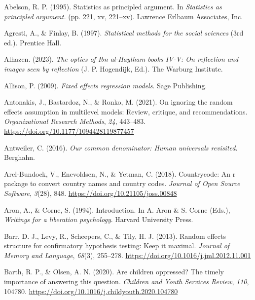 \documentclass[
  letterpaper,
  DIV=11,
  numbers=noendperiod]{scrreprt}
\newlength{\cslhangindent}
\newenvironment{CSLReferences}[2] %
 {\begin{list}{}{%
  \setlength{\itemindent}{0pt}
  \setlength{\leftmargin}{0pt}
  \setlength{\parsep}{0pt}
  \ifodd #1
   \setlength{\leftmargin}{\cslhangindent}
   \setlength{\itemindent}{-1\cslhangindent}
  \fi
  \setlength{\itemsep}{#2\baselineskip}}}
 {\end{list}}
\begin{document}
\label{refs}
\begin{CSLReferences}{1}{0}
Abelson, R. P. (1995). Statistics as principled argument. In
\emph{Statistics as principled argument.} (pp. 221, xv, 221--xv).
Lawrence Erlbaum Associates, Inc.

Agresti, A., \& Finlay, B. (1997). \emph{Statistical methods for the
social sciences} (3rd ed.). Prentice Hall.

Alhazen. (2023). \emph{The optics of {I}bn al-{H}aytham books {IV-V}: On
reflection and images seen by reflection} (J. P. Hogendijk, Ed.). The
Warburg Institute.

Allison, P. (2009). \emph{Fixed effects regression models}. Sage
Publishing.

Antonakis, J., Bastardoz, N., \& Ronko, M. (2021). On ignoring the
random effects assumption in multilevel models: Review, critique, and
recommendations. \emph{Organizational Research Methods}, \emph{24},
443--483. \url{https://doi.org/10.1177/1094428119877457}

Antweiler, C. (2016). \emph{Our common denominator: Human universals
revisited}. Berghahn.

Arel-Bundock, V., Enevoldsen, N., \& Yetman, C. (2018). Countrycode: An
r package to convert country names and country codes. \emph{Journal of
Open Source Software}, \emph{3}(28), 848.
\url{https://doi.org/10.21105/joss.00848}

Aron, A., \& Corne, S. (1994). Introduction. In A. Aron \& S. Corne
(Eds.), \emph{Writings for a liberation psychology}. Harvard University
Press.

Barr, D. J., Levy, R., Scheepers, C., \& Tily, H. J. (2013). Random
effects structure for confirmatory hypothesis testing: Keep it maximal.
\emph{Journal of Memory and Language}, \emph{68}(3), 255--278.
\url{https://doi.org/10.1016/j.jml.2012.11.001}

Barth, R. P., \& Olsen, A. N. (2020). Are children oppressed? The timely
importance of answering this question. \emph{Children and Youth Services
Review}, \emph{110}, 104780.
\url{https://doi.org/10.1016/j.childyouth.2020.104780}


\end{CSLReferences}
\end{document}

